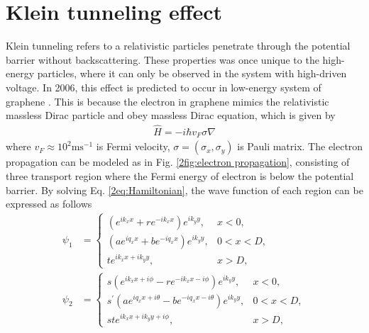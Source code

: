 

\section{Klein tunneling effect}
    Klein tunneling refers to a relativistic particles penetrate through the potential barrier without backscattering.
    These properties was once unique to the high-energy particles, where it can only be observed in the system with high-driven voltage.
    In 2006, this effect is predicted to occur in low-energy system of graphene \cite{Katsnelson2006a}.
    This is because the electron in graphene mimics the relativistic massless Dirac particle and obey massless Dirac equation,
    which is given by
    \begin{align} \label{2eq:Hamiltonian}
        \hat{H} = -i\hbar v_F \sigma \nabla 
    \end{align}
    where $v_F \approx 10^2 \mathrm{ms^{-1}}$ is Fermi velocity, $\sigma = (\sigma_x, \sigma_y)$ is Pauli matrix. 
    The electron propagation can be modeled as in Fig. \ref{2fig:electron propagation}, consisting of three transport region where the Fermi energy of electron is below the potential barrier.
    By solving Eq. \ref{2eq:Hamiltonian}, the wave function of each region can be expressed as follows
    \begin{equation} \label{2eq:wave function}
        \begin{aligned}
            \psi_1 &= \begin{cases} (e^{ik_x x}+re^{-ik_x x})e^{ik_y y}, &x<0,\\
                (ae^{i q_x x}+be^{-i q_x x})e^{ik_y y},  &0<x<D,\\
                te^{ik_x x + ik_y y},  &x>D,
                \end{cases}\\
            \psi_2 &= \begin{cases} s(e^{ik_x x+i \phi}-re^{-ik_x x-i \phi})e^{ik_y y},  &x<0,\\
                s^\prime(ae^{i q_x x+ i \theta}-be^{-i q_x x- i \theta})e^{ik_y y}, &0<x<D,\\
                ste^{ik_x x + ik_y y+ i \phi}, &x>D,
                \end{cases}
        \end{aligned}
    \end{equation}
